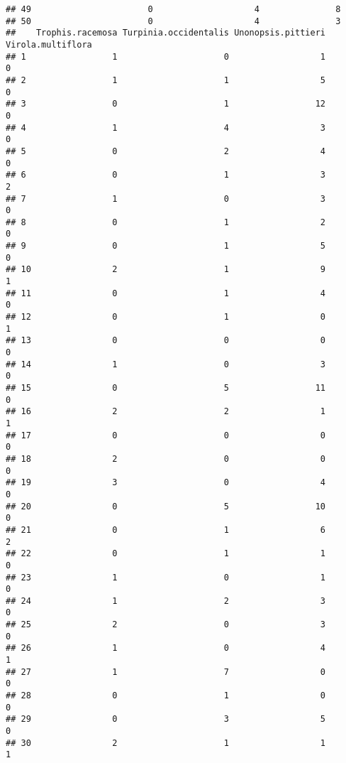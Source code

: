 \documentclass[
]{article}
\begin{document}
\begin{verbatim}
## 49                       0                    4               8
## 50                       0                    4               3
##    Trophis.racemosa Turpinia.occidentalis Unonopsis.pittieri Virola.multiflora
## 1                 1                     0                  1                 0
## 2                 1                     1                  5                 0
## 3                 0                     1                 12                 0
## 4                 1                     4                  3                 0
## 5                 0                     2                  4                 0
## 6                 0                     1                  3                 2
## 7                 1                     0                  3                 0
## 8                 0                     1                  2                 0
## 9                 0                     1                  5                 0
## 10                2                     1                  9                 1
## 11                0                     1                  4                 0
## 12                0                     1                  0                 1
## 13                0                     0                  0                 0
## 14                1                     0                  3                 0
## 15                0                     5                 11                 0
## 16                2                     2                  1                 1
## 17                0                     0                  0                 0
## 18                2                     0                  0                 0
## 19                3                     0                  4                 0
## 20                0                     5                 10                 0
## 21                0                     1                  6                 2
## 22                0                     1                  1                 0
## 23                1                     0                  1                 0
## 24                1                     2                  3                 0
## 25                2                     0                  3                 0
## 26                1                     0                  4                 1
## 27                1                     7                  0                 0
## 28                0                     1                  0                 0
## 29                0                     3                  5                 0
## 30                2                     1                  1                 1

\end{verbatim}
\end{document}
